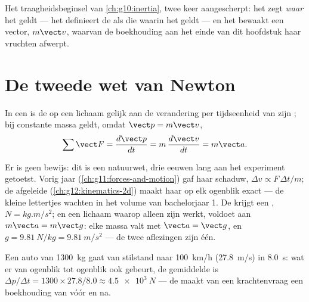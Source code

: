 \begin{remark}\label{rem:g12:newtons-laws:sharpened}
Het traagheidsbeginsel van \cref{ch:g10:inertia}, twee keer aangescherpt: het zegt
\emph{waar} het geldt --- het definieert de  als die waarin het
geldt --- en het bewaakt een vector, $m\vect v$, waarvan de boekhouding aan het einde
van dit hoofdstuk haar vruchten afwerpt.
\end{remark}

\section{De tweede wet van Newton}

\begin{theorem}\label{thm:g12:newtons-laws:second}
In een  is de  op een lichaam gelijk aan de
verandering per tijdseenheid van zijn ; bij constante massa geldt, omdat
$\vect p = m\vect v$,
\[
\sum \vect F = \frac{d\vect p}{dt} = m\,\frac{d\vect v}{dt} = m \vect a .
\]
\end{theorem}
\admitted

\begin{remark}\label{rem:g12:newtons-laws:nature}
Er is geen bewijs: dit is een natuurwet, drie eeuwen lang aan het experiment
getoetst. Vorig jaar (\cref{ch:g11:forces-and-motion}) gaf haar schaduw,
$\Delta v \propto F\,\Delta t/m$; de afgeleide (\cref{ch:g12:kinematics-2d}) maakt
haar op elk ogenblik exact --- de kleine lettertjes wachten in het volume van
bachelorjaar 1. De  krijgt een , $\unit{N} = \unit{kg.m/s^2}$; en een
lichaam waarop alleen zijn  werkt, voldoet aan $m\vect a = m\vect g$: elke
massa valt met $\vect a = \vect g$, en
$g = \qty{9.81}{N/kg} = \qty{9.81}{m/s^2}$ --- de twee aflezingen zijn één.
\end{remark}

\begin{example}\label{ex:g12:newtons-laws:average}
Een auto van \qty{1300}{kg} gaat van stilstand naar \qty{100}{km/h}
(\qty{27.8}{m/s}) in \qty{8.0}{s}: wat er van ogenblik tot ogenblik ook gebeurt, de
gemiddelde  is
$\Delta p/\Delta t = 1300 \times 27.8/8.0 \approx \qty{4.5e3}{N}$ --- de 
maakt van een krachtenvraag een boekhouding van vóór en na.
\end{example}

